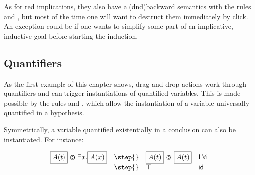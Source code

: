 

As for red implications, they also have a \kl(dnd){backward} semantics with the rules
 and , but most of the time one
will want to destruct them immediately by click. An exception could be if one
wants to simplify some part of an implicative, inductive goal before starting
the induction.

\subsection{Quantifiers}
As the first example of this chapter shows, drag-and-drop actions work through
quantifiers and can trigger instantiations of quantified variables. This is made
possible by the rules  and , which allow the
instantiation of a variable universally quantified in a hypothesis.

Symmetrically, a variable quantified existentially in a conclusion can
also be instantiated. For instance:

$$\begin{array}{llll}
    \select{A(t)}\back \exists x.\select{A(x)}&\step{}&
                                                      \select{A(t)}\back\select{A(t)}&\mathsf{L}\forall\mathsf{i}
    \\
                                               &\step{}& \top&\mathsf{id}
  \end{array}
  $$

